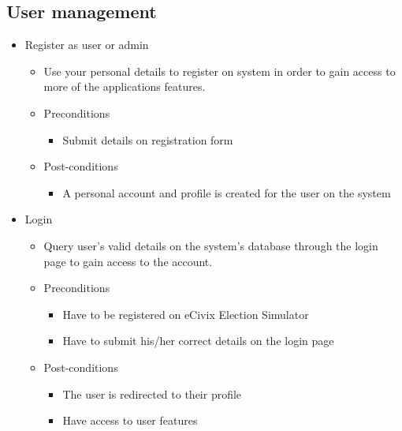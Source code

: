 \documentclass{article}
\begin{document}
   	\subsection{User management} 
    \begin{itemize}
    				\item Register as user or admin
				\begin{itemize}
					\item Use your personal details to register on system in order to gain access to more of the applications features.

					\item Preconditions
					\begin{itemize}
						\item Submit details on registration form
					\end{itemize}
					\item Post-conditions
					\begin{itemize}
						\item A personal account and profile is created for the user on the system
					\end{itemize}
				\end{itemize}
				
				\item Login
				\begin{itemize}
					\item Query user’s valid details on the system’s database through the login page to gain access to the account. 
					\item Preconditions
					\begin{itemize}
						\item Have to be registered on eCivix Election Simulator
						\item Have to submit his/her correct details on the login page
					\end{itemize}
					\item Post-conditions
					\begin{itemize}
						\item The user is redirected to their profile
						\item Have access to user features
					\end{itemize}
				\end{itemize}
				

\end{itemize}
\end{document}
